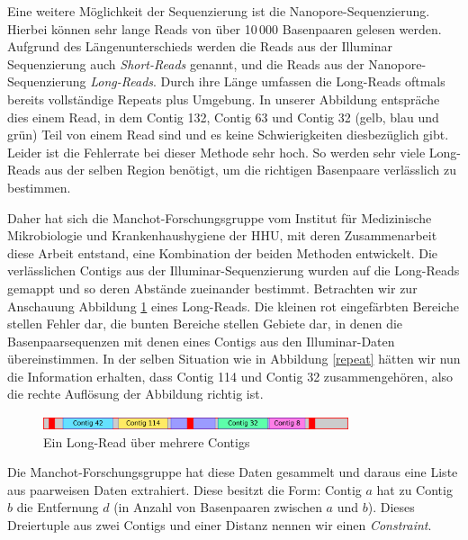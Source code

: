 Eine weitere Möglichkeit der Sequenzierung ist die Nanopore-Sequenzierung. Hierbei können sehr lange Reads von über 10\,000 Basenpaaren gelesen werden. Aufgrund des Längenunterschieds werden die Reads aus der Illuminar Sequenzierung auch \emph{Short-Reads} genannt, und die Reads aus der Nanopore-Sequenzierung \emph{Long-Reads}. Durch ihre Länge umfassen die Long-Reads oftmals bereits vollständige Repeats plus Umgebung. In unserer Abbildung entspräche dies einem Read, in dem Contig 132, Contig 63 und Contig 32 (gelb, blau und grün) Teil von einem Read sind und es keine Schwierigkeiten diesbezüglich gibt. Leider ist die Fehlerrate bei dieser Methode sehr hoch. 
So werden sehr viele Long-Reads aus der selben Region benötigt, um die richtigen Basenpaare verlässlich zu bestimmen.


Daher hat sich die Manchot-Forschungsgruppe vom Institut für Medizinische Mikrobiologie und Krankenhaushygiene der HHU, mit deren Zusammenarbeit diese Arbeit entstand, eine Kombination der beiden Methoden entwickelt.
Die verlässlichen Contigs aus der Illuminar-Sequenzierung wurden auf die Long-Reads gemappt und so deren Abstände zueinander bestimmt. Betrachten wir zur Anschauung Abbildung \ref{longread} eines Long-Reads. Die kleinen rot eingefärbten Bereiche stellen Fehler dar, die bunten Bereiche stellen Gebiete dar, in denen die Basenpaarsequenzen mit denen eines Contigs aus den Illuminar-Daten übereinstimmen. In der selben Situation wie in Abbildung \ref{repeat} hätten wir nun die Information erhalten, dass Contig 114 und Contig 32 zusammengehören, also die rechte Auflösung der Abbildung richtig ist. 
\begin{figure}
\begin{center}
\includegraphics[width=0.8\textwidth]{bilder/longread}
\end{center}
\caption{Ein Long-Read über mehrere Contigs}
\label{longread}
\end{figure}
Die Manchot-Forschungsgruppe hat diese Daten gesammelt und daraus eine Liste aus paarweisen Daten extrahiert. Diese besitzt die Form: Contig $a$ hat zu Contig $b$ die Entfernung $d$ (in Anzahl von Basenpaaren zwischen $a$ und $b$). Dieses Dreiertuple aus zwei Contigs und einer Distanz nennen wir einen \emph{Constraint}.


